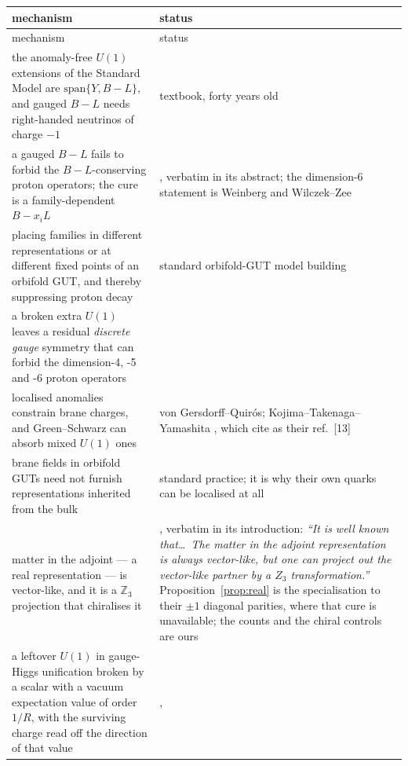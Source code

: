 \documentclass[11pt,a4paper]{article}
\newcommand{\ZZ}{\mathbb{Z}}
\begin{document}
\begingroup\small
\begin{longtable}{p{}p{}}
\toprule
\rowcolor{hdrblue!12}
mechanism & status\\
\midrule
\endfirsthead
\toprule
\rowcolor{hdrblue!12}
mechanism & status\\
\midrule
\endhead
the anomaly-free $U(1)$ extensions of the Standard Model are
$\mathrm{span}\{Y,B-L\}$, and gauged $B-L$ needs right-handed neutrinos of charge $-1$ &
textbook, forty years old\\
a gauged $B-L$ fails to forbid the $B-L$-conserving proton operators; the cure is a
family-dependent $B-x_iL$ & \cite{FamilyU1}, verbatim in its abstract; the dimension-6 statement is
Weinberg and Wilczek--Zee \cite{Weinberg,WZ}\\
placing families in different representations or at different fixed points of an orbifold GUT, and
thereby suppressing proton decay & standard orbifold-GUT model building \cite{Raby,OrbGUT}\\
a broken extra $U(1)$ leaves a residual \emph{discrete gauge} symmetry that can forbid the
dimension-4, -5 and -6 proton operators & \cite{KW,IR,DiscGauge,Orth}\\
localised anomalies constrain brane charges, and Green--Schwarz can absorb mixed $U(1)$ ones &
von Gersdorff--Quir\'os; Kojima--Takenaga--Yamashita \cite{KTY}, which \cite{KM25} cite as their
ref.~[13]\\
brane fields in orbifold GUTs need not furnish representations inherited from the bulk & standard
practice; it is why their own quarks can be localised at all\\
matter in the adjoint --- a real representation --- is vector-like, and it is a $\ZZ_3$ projection
that chiralises it & \cite{GMN}, verbatim in its introduction: \emph{``It is well known that\dots\
The matter in the adjoint representation is always vector-like, but one can project out the
vector-like partner by a $Z_3$ transformation.''} Proposition~\ref{prop:real} is the specialisation
to their $\pm1$ diagonal parities, where that cure is unavailable; the counts and the chiral controls
are ours\\
a leftover $U(1)$ in gauge-Higgs unification broken by a scalar with a vacuum expectation value of
order $1/R$, with the surviving charge read off the direction of that value & \cite{GHK},

\end{longtable}
\end{document}

